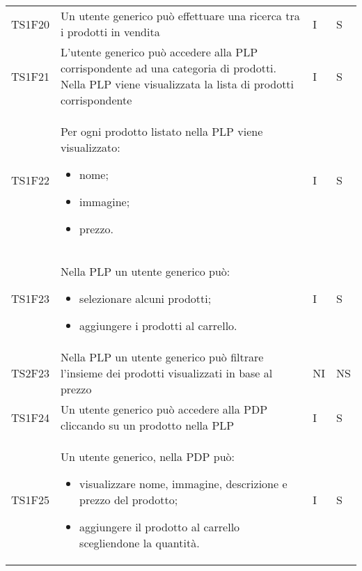 {\begin{longtable}{C{2cm} C{9.6cm} C{1.5cm} C{1cm}}
TS1F20 & Un utente generico può effettuare una ricerca tra i prodotti in vendita & I & S\\

TS1F21 & L'utente generico può accedere alla PLP corrispondente ad una categoria di prodotti. Nella PLP viene visualizzata la lista di prodotti corrispondente & I & S\\

TS1F22 & Per ogni prodotto listato nella PLP viene visualizzato:
\begin{itemize}
	\item nome;
	\item immagine;
	\item prezzo.
\end{itemize} & I & S\\

TS1F23 & Nella PLP un utente generico può:
\begin{itemize}
	\item selezionare alcuni prodotti;
	\item aggiungere i prodotti al carrello.
\end{itemize} & I & S\\

TS2F23 & Nella PLP un utente generico può filtrare l'insieme dei prodotti visualizzati in base al prezzo & NI & NS\\

TS1F24 & Un utente generico può accedere alla PDP cliccando su un prodotto nella PLP & I & S\\

TS1F25 & Un utente generico, nella PDP può:
\begin{itemize}
	\item visualizzare nome, immagine, descrizione e prezzo del prodotto;
	\item aggiungere il prodotto al carrello scegliendone la quantità.
\end{itemize} & I & S\\



\end{longtable}


}
